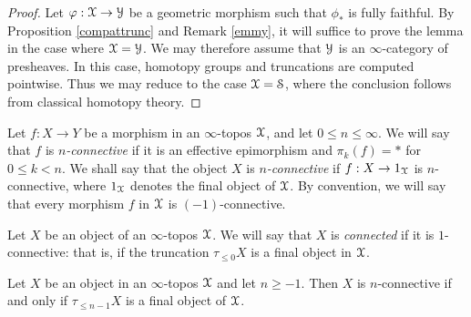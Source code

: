 \begin{proof}
Let $\varphi: \operatorname{\mathcal{X}} \rightarrow \operatorname{\mathcal{Y}}$ be a geometric morphism such
that $\phi_{\ast}$ is fully faithful. By Proposition
\ref{compattrunc} and Remark \ref{emmy}, it will suffice to prove
the lemma in the case where $\operatorname{\mathcal{X}} = \operatorname{\mathcal{Y}}$. We may therefore assume that $\operatorname{\mathcal{Y}}$ is an $\infty$-category of presheaves. In this case, homotopy groups and truncations are
computed pointwise. Thus we may reduce to the case $\operatorname{\mathcal{X}} =
\operatorname{\mathcal{S}}$, where the conclusion follows from classical homotopy theory. 
\end{proof}

\begin{definition}\label{stooog}
Let $f: X \rightarrow Y$ be a morphism in an $\infty$-topos
$\operatorname{\mathcal{X}}$, and let $0 \leq n \leq \infty$. We will say that $f$ is
{\it $n$-connective} if it is an effective epimorphism and $\pi_k(f) = \ast$ for
$0 \leq k < n$. We shall say that the object $X$ is {\it
$n$-connective} if $f: X \rightarrow 1_{\operatorname{\mathcal{X}}}$ is $n$-connective, where $1_{\operatorname{\mathcal{X}}}$ denotes the final object of $\operatorname{\mathcal{X}}$. By convention, we will say that every morphism $f$ in $\operatorname{\mathcal{X}}$ is
$(-1)$-connective.
\end{definition}

\begin{definition}
Let $X$ be an object of an $\infty$-topos $\operatorname{\mathcal{X}}$. We will say that $X$ is {\it connected} if
it is $1$-connective: that is, if the truncation $\tau_{\leq 0} X$ is a final object in $\operatorname{\mathcal{X}}$.
\end{definition}


\begin{proposition}\label{goober}
Let $X$ be an object in an $\infty$-topos $\operatorname{\mathcal{X}}$ and let $n \geq -1$. Then $X$ is
$n$-connective if and only if $\tau_{\leq n-1} X$ is a final object of $\operatorname{\mathcal{X}}$.
\end{proposition}

